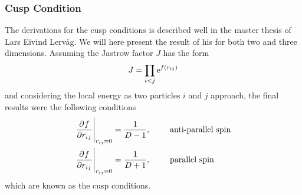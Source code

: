     \subsubsection{Cusp Condition\label{sususec:cusp_condition}}
        The derivations for the cusp conditions is described well in the master
        thesis of Lars Eivind Lervåg\cite{larsEivindThesis}. We will here
        present the result of his for both two and three dimensions. Assuming
        the Jastrow factor $J$ has the form
            \begin{equation}
                J = \prod_{i<j} \mathrm{e}^{f\left(r_{ij}\right)}
            \end{equation}
        and considering the local energy as two particles $i$ and $j$ approach,
        the final results were the following conditions
            \begin{equation} 
                    \begin{aligned}
                        \prd{r_{ij}}[f] \Bigg|_{r_{ij}=0} &=
                        \frac{1}{D-1},&\indent& \text{anti-parallel spin} \\
                        \prd{r_{ij}}[f] \Bigg|_{r_{ij}=0} &=
                        \frac{1}{D+1},&\indent& \text{parallel spin}
                    \end{aligned}
            \end{equation}
        which are known as the cusp conditions.
    
